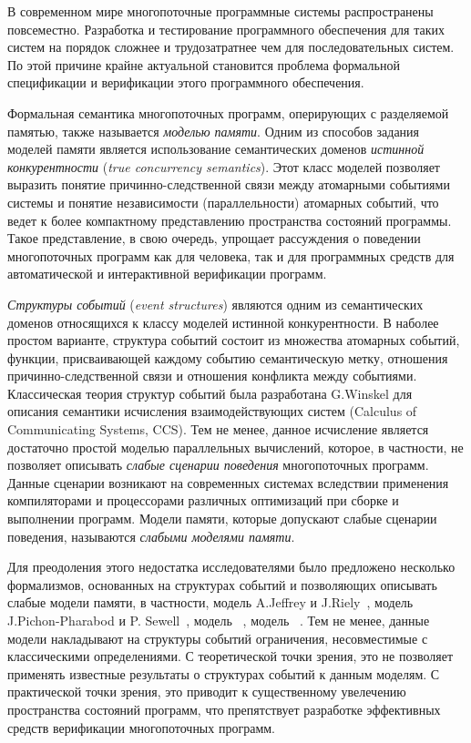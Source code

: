 
{\actuality} 
В современном мире многопоточные программные системы распространены повсеместно. 
Разработка и тестирование программного обеспечения для таких систем на порядок 
сложнее и трудозатратнее чем для последовательных систем. 
По этой причине крайне актуальной становится проблема 
формальной спецификации и верификации этого программного обеспечения. 

Формальная семантика многопоточных программ, оперирующих с разделяемой памятью,
также называется \emph{моделью памяти}.
Одним из способов задания моделей памяти
является использование семантических доменов
\emph{истинной конкурентности} (\emph{true concurrency semantics}).
Этот класс моделей позволяет выразить
понятие причинно-следственной связи между атомарными событиями системы
и понятие независимости (параллельности) атомарных событий,
что ведет к более компактному представлению пространства состояний программы.
Такое представление, в свою очередь, упрощает рассуждения 
о поведении многопоточных программ как для человека, 
так и для программных средств для автоматической и интерактивной верификации программ. 

\emph{Структуры событий} (\emph{event structures}) являются одним из семантических доменов 
относящихся к классу моделей истинной конкурентности.
В наболее простом варианте, структура событий состоит из множества атомарных событий,
функции, присваивающей каждому событию семантическую метку,
отношения причинно-следственной связи и отношения конфликта между событиями.
Классическая теория структур событий была разработана G.Winskel для описания семантики 
исчисления взаимодействующих систем (Calculus of Communicating Systems, CCS).
Тем не менее, данное исчисление является достаточно простой моделью параллельных вычислений,
которое, в частности, не позволяет описывать 
\emph{слабые сценарии поведения} многопоточных программ.
Данные сценарии возникают на современных системах вследствии 
применения компиляторами и процессорами
различных оптимизаций при сборке и выполнении программ.
Модели памяти, которые допускают слабые сценарии поведения, называются \emph{слабыми моделями памяти}.

Для преодоления этого недостатка исследователями было
предложено несколько формализмов, основанных на структурах событий
и позволяющих описывать слабые модели памяти,
в частности, модель A.Jeffrey и J.Riely~\autocite{Jeffrey-Riely:LICS16},
модель J.Pichon-Pharabod и P. Sewell~\autocite{PichonPharabod-Sewell:POPL16},
модель \Wkm~\autocite{Chakraborty-Vafeiadis:POPL19},
модель \MRD~\autocite{Paviotti-al:ESOP20}. 
Тем не менее, данные модели накладывают на структуры событий
ограничения, несовместимые с классическими определениями. 
С теоретической точки зрения, это не позволяет 
применять известные результаты о структурах событий к данным моделям. 
С практической точки зрения, это приводит к существенному увелечению 
пространства состояний программ, что препятствует разработке эффективных 
средств верификации многопоточных программ.

